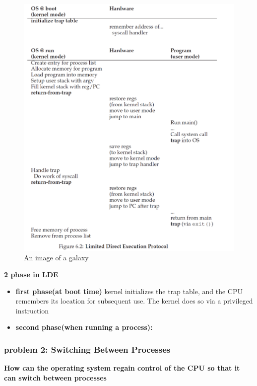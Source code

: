 \documentclass{article}
\begin{document}
\begin{figure}[H]
    \centering
    \includegraphics[width=13cm] {fig6.2.png}
    \caption{An image of a galaxy}
    \label{fig:galaxy}
\end{figure}
\textbf{2 phase in LDE}
\begin{itemize}
    \item \textbf{first phase(at boot time)} kernel initializes the trap table, and the CPU remembers its location for subsequent use. The kernel does so via a privileged instruction
    
    \item \textbf{second phase(when running a process): }
\end{itemize}

\subsubsection{problem 2: Switching Between Processes}
\textbf{\color{red}How can the operating system regain control of the CPU so that it can
switch between processes}
\end{document}
